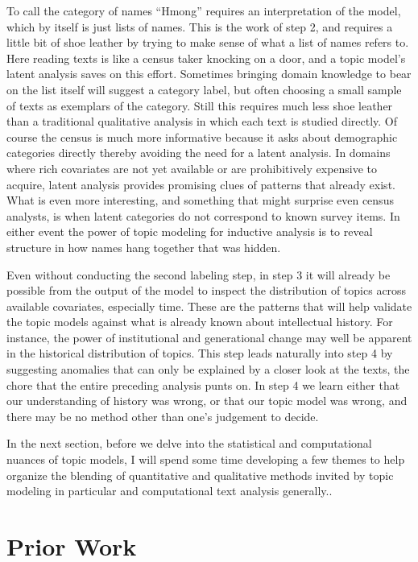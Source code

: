 \documentclass[]{book}
\begin{document}
To call the category of names ``Hmong'' requires an interpretation of
the model, which by itself is just lists of names. This is the work of
step 2, and requires a little bit of shoe leather by trying to make
sense of what a list of names refers to. Here reading texts is like a
census taker knocking on a door, and a topic model's latent analysis
saves on this effort. Sometimes bringing domain knowledge to bear on the
list itself will suggest a category label, but often choosing a small
sample of texts as exemplars of the category. Still this requires much
less shoe leather than a traditional qualitative analysis in which each
text is studied directly. Of course the census is much more informative
because it asks about demographic categories directly thereby avoiding
the need for a latent analysis. In domains where rich covariates are not
yet available or are prohibitively expensive to acquire, latent analysis
provides promising clues of patterns that already exist. What is even
more interesting, and something that might surprise even census
analysts, is when latent categories do not correspond to known survey
items. In either event the power of topic modeling for inductive
analysis is to reveal structure in how names hang together that was
hidden.

Even without conducting the second labeling step, in step 3 it will
already be possible from the output of the model to inspect the
distribution of topics across available covariates, especially time.
These are the patterns that will help validate the topic models against
what is already known about intellectual history. For instance, the
power of institutional and generational change may well be apparent in
the historical distribution of topics. This step leads naturally into
step 4 by suggesting anomalies that can only be explained by a closer
look at the texts, the chore that the entire preceding analysis punts
on. In step 4 we learn either that our understanding of history was
wrong, or that our topic model was wrong, and there may be no method
other than one's judgement to decide.

In the next section, before we delve into the statistical and
computational nuances of topic models, I will spend some time developing
a few themes to help organize the blending of quantitative and
qualitative methods invited by topic modeling in particular and
computational text analysis generally..

\chapter{Prior Work}\label{kd-lit}
\end{document}
